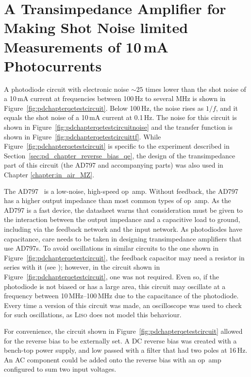 \section{A Transimpedance Amplifier for Making Shot Noise limited Measurements of 10\,mA Photocurrents}
\label{sec:circuits_appendix_variable_bias_ad797}
A photodiode circuit with electronic noise $\sim\!25$ times lower than the shot noise of a 10\,mA current at frequencies between 100\,Hz to several MHz is shown in Figure~\ref{fig:pdchapterqetestcircuit}. Below 100\,Hz, the noise rises as $1/f$, and it equals the shot noise of a 10\,mA current at 0.1\,Hz. The noise for this circuit is shown in Figure~\ref{fig:pdchapterqetestcircuitnoise} and the transfer function is shown in Figure~\ref{fig:pdchapterqetestcircuittf}. While Figure~\ref{fig:pdchapterqetestcircuit} is specific to the experiment described in Section~\ref{sec:pd_chapter_reverse_bias_qe}, the design of the transimpedance part of this circuit (the AD797 and accompanying parts) was also used in Chapter \ref{chapter:in_air_MZ}. 
\par
The AD797~\cite{AD797} is a low-noise, high-speed op~amp. Without feedback, the AD797 has a higher output impedance than most common types of op~amp. As the AD797 is a fast device, the datasheet warns that consideration must be given to the interaction between the output impedance and a capacitive load to ground, including via the feedback network and the input network. As photodiodes have capacitance, care needs to be taken in designing transimpedance amplifiers that use AD797s. To avoid oscillations in similar circuits to the one shown in Figure~\ref{fig:pdchapterqetestcircuit}, the feedback capacitor may need a resistor in series with it (see \cite[p.14]{AD797}); however, in the circuit shown in Figure~\ref{fig:pdchapterqetestcircuit}, one was not required. Even so, if the photodiode is not biased or has a large area, this circuit may oscillate at a frequency between 10\,MHz--100\,MHz due to the capacitance of the photodiode. Every time a version of this circuit was made, an oscilloscope was used to check for such oscillations, as \textsc{Liso} does not model this behaviour. 
\par	
For convenience, the circuit shown in Figure~\ref{fig:pdchapterqetestcircuit} allowed for the reverse bias to be externally set. A DC reverse bias was created with a bench-top power supply, and low passed with a filter that had two poles at 16\,Hz. An AC component could be added onto the reverse bias with an op~amp configured to sum two input voltages.
